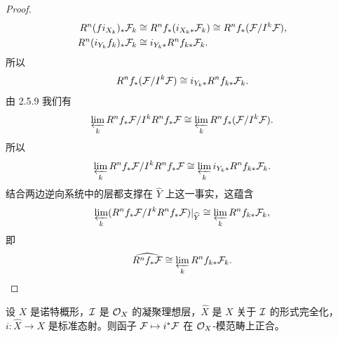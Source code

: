 \begin{proof}
\begin{align*}
R^n(fi_{X_k})_*\mathcal{F}_k&\cong R^nf_*(i_{X_k*}\mathcal{F}_k)\cong R^nf_*(\mathcal{F}/I^k\mathcal{F}),\\
R^n(i_{Y_k}f_k)_*\mathcal{F}_k&\cong i_{Y_k*}R^nf_{k*}\mathcal{F}_k.
\end{align*}
所以
\begin{equation*}
R^nf_*(\mathcal{F}/I^k\mathcal{F})\cong i_{Y_k*}R^nf_{k*}\mathcal{F}_k.
\end{equation*}
由 2.5.9 我们有
\begin{equation*}
\varprojlim_k R^nf_*\mathcal{F}/I^kR^nf_*\mathcal{F}\cong\varprojlim_k R^nf_*(\mathcal{F}/I^k\mathcal{F}).
\end{equation*}
所以
\begin{equation*}
\varprojlim_k R^nf_*\mathcal{F}/I^kR^nf_*\mathcal{F}\cong\varprojlim_k i_{Y_k*}R^nf_{k*}\mathcal{F}_k.
\end{equation*}
结合两边逆向系统中的层都支撑在 $\widehat{Y}$ 上这一事实，这蕴含
\begin{equation*}
\varprojlim_k(R^nf_*\mathcal{F}/I^kR^nf_*\mathcal{F})|_{\widehat{Y}}\cong\varprojlim_k R^nf_{k*}\mathcal{F}_k,
\end{equation*}
即
\begin{equation*}
\widehat{R^nf_*\mathcal{F}}\cong\varprojlim_k R^nf_{k*}\mathcal{F}_k.
\end{equation*}
\end{proof}

\begin{lemma}\label{it:2.7.7}
设 $X$ 是诺特概形，$\mathcal{I}$ 是 $\mathcal{O}_X$ 的凝聚理想层，$\widehat{X}$ 是 $X$ 关于 $\mathcal{I}$ 的形式完全化，$i\colon\widehat{X}\to X$ 是标准态射。则函子 $\mathcal{F}\mapsto i^*\mathcal{F}$ 在 $\mathcal{O}_X$-模范畴上正合。
\end{lemma}

